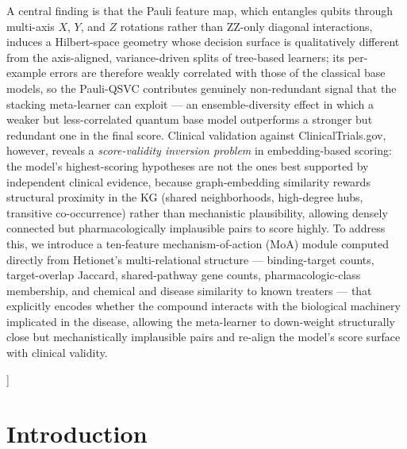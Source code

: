 \documentclass[twocolumn,10pt]{article}
\begin{document}
\begin{onecolabstract}
A central finding is that the Pauli feature map, which entangles qubits through multi-axis $X$, $Y$, and $Z$ rotations rather than ZZ-only diagonal interactions, induces a Hilbert-space geometry whose decision surface is qualitatively different from the axis-aligned, variance-driven splits of tree-based learners; its per-example errors are therefore weakly correlated with those of the classical base models, so the Pauli-QSVC contributes genuinely non-redundant signal that the stacking meta-learner can exploit --- an ensemble-diversity effect in which a weaker but less-correlated quantum base model outperforms a stronger but redundant one in the final score. Clinical validation against ClinicalTrials.gov, however, reveals a \textit{score-validity inversion problem} in embedding-based scoring: the model's highest-scoring hypotheses are not the ones best supported by independent clinical evidence, because graph-embedding similarity rewards structural proximity in the KG (shared neighborhoods, high-degree hubs, transitive co-occurrence) rather than mechanistic plausibility, allowing densely connected but pharmacologically implausible pairs to score highly. To address this, we introduce a ten-feature mechanism-of-action (MoA) module computed directly from Hetionet's multi-relational structure --- binding-target counts, target-overlap Jaccard, shared-pathway gene counts, pharmacologic-class membership, and chemical and disease similarity to known treaters --- that explicitly encodes whether the compound interacts with the biological machinery implicated in the disease, allowing the meta-learner to down-weight structurally close but mechanistically implausible pairs and re-align the model's score surface with clinical validity.
  \end{onecolabstract}
  \vspace{1em}
]

\setcounter{footnote}{2}
\renewcommand{\thefootnote}{\arabic{footnote}}

\section{Introduction}
\end{document}
